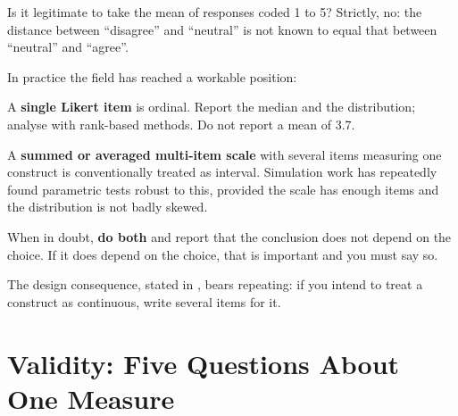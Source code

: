 \begin{conceptbox}
Is it legitimate to take the mean of responses coded 1 to 5? Strictly, no: the
distance between ``disagree'' and ``neutral'' is not known to equal that
between ``neutral'' and ``agree''.

\medskip
In practice the field has reached a workable position:

\begin{tight}
  \item A \textbf{single Likert item} is ordinal. Report the median and the
    distribution; analyse with rank-based methods. Do not report a mean of 3.7.
  \item A \textbf{summed or averaged multi-item scale} with several items
    measuring one construct is conventionally treated as interval. Simulation
    work has repeatedly found parametric tests robust to this, provided the
    scale has enough items and the distribution is not badly skewed.
  \item When in doubt, \textbf{do both} and report that the conclusion does not
    depend on the choice. If it does depend on the choice, that is important
    and you must say so.
\end{tight}

\medskip
The design consequence, stated in , bears repeating: if you
intend to treat a construct as continuous, write several items for it.
\end{conceptbox}

\section{Validity: Five Questions About One Measure}


